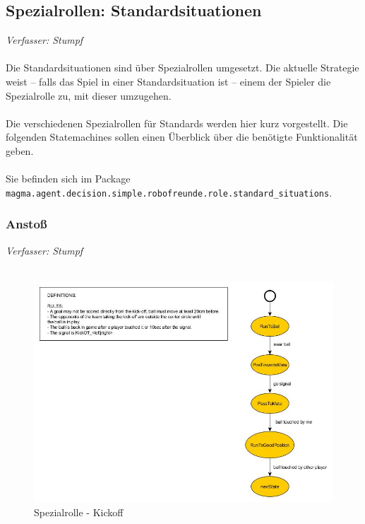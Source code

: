 \documentclass[fontsize=12pt,a4paper,final]{scrartcl}[2003/01/01]
\begin{document}
\subsection{Spezialrollen: Standardsituationen}
\textit{Verfasser: Stumpf}\\
\\
Die Standardsituationen sind über Spezialrollen umgesetzt. Die aktuelle Strategie weist -- falls das Spiel in einer Standardsituation ist -- einem der Spieler die Spezialrolle zu, mit dieser umzugehen.\\
\\
Die verschiedenen Spezialrollen für Standards werden hier kurz vorgestellt. Die folgenden Statemachines sollen einen Überblick über die benötigte Funktionalität geben.\\
\\
Sie befinden sich im Package\\\texttt{magma.agent.decision.simple.robofreunde.role.standard\_situations}.

\subsubsection{Ansto{\ss}}
\textit{Verfasser: Stumpf}\\
\\
\begin{figure}[H]
	\centering
	\includegraphics[width=\textwidth]{Grafiken/KI/Standardsituationen/KickoffSM}
	\caption{Spezialrolle - Kickoff}
	\label{fig:Standard - Kickoff}
\end{figure}
\end{document}
